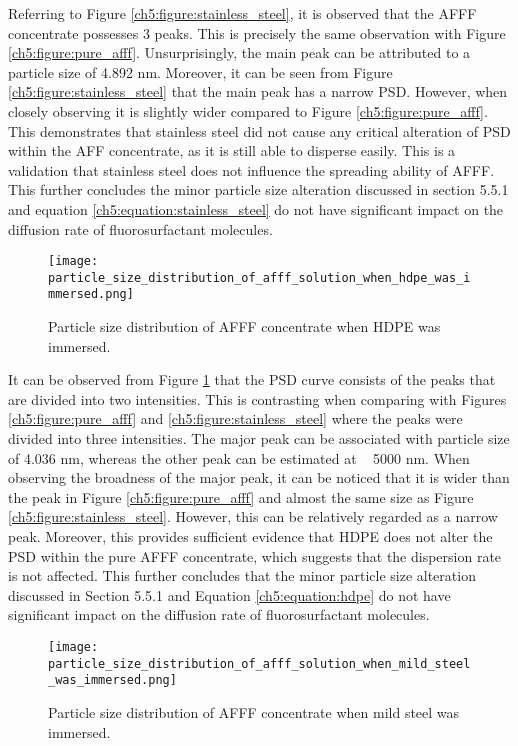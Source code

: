 Referring to Figure \ref{ch5:figure:stainless_steel}, it is observed that the AFFF concentrate possesses 3 peaks. This is precisely the same observation with Figure \ref{ch5:figure:pure_afff}. Unsurprisingly, the main peak can be attributed to a particle size of 4.892 nm. Moreover, it can be seen from Figure \ref{ch5:figure:stainless_steel} that the main peak has a narrow PSD. However, when closely observing it is slightly wider compared to Figure \ref{ch5:figure:pure_afff}. This demonstrates that stainless steel did not cause any critical alteration of PSD within the AFF concentrate, as it is still able to disperse easily. This is a validation that stainless steel does not influence the spreading ability of AFFF. This further concludes the minor particle size alteration discussed in section 5.5.1 and equation \ref{ch5:equation:stainless_steel} do not have significant impact on the diffusion rate of fluorosurfactant molecules.     
  
\begin{figure}[H]
    \centering
    \texttt{[image: particle\_size\_distribution\_of\_afff\_solution\_when\_hdpe\_was\_immersed.png]}
    \caption{Particle size distribution of AFFF concentrate when HDPE was immersed.}
    \label{ch5:figure:hdpe}
\end{figure}

It can be observed from Figure \ref{ch5:figure:hdpe} that the PSD curve consists of the peaks that are divided into two intensities. This is contrasting when comparing with Figures \ref{ch5:figure:pure_afff} and \ref{ch5:figure:stainless_steel} where the peaks were divided into three intensities. The major peak can be associated with particle size of 4.036 nm, whereas the other peak can be estimated at ~ 5000 nm. When observing the broadness of the major peak, it can be noticed that it is wider than the peak in Figure \ref{ch5:figure:pure_afff} and almost the same size as Figure \ref{ch5:figure:stainless_steel}. However, this can be relatively regarded as a narrow peak. Moreover, this provides sufficient evidence that HDPE does not alter the PSD within the pure AFFF concentrate, which suggests that the dispersion rate is not affected. This further concludes that the minor particle size alteration discussed in Section 5.5.1 and Equation \ref{ch5:equation:hdpe} do not have significant impact on the diffusion rate of fluorosurfactant molecules.    
  
\begin{figure}[H]
    \centering
    \texttt{[image: particle\_size\_distribution\_of\_afff\_solution\_when\_mild\_steel\_was\_immersed.png]}
    \caption{Particle size distribution of AFFF concentrate when mild steel was immersed.}
    \label{ch5:figure:mild_steel}
\end{figure}

